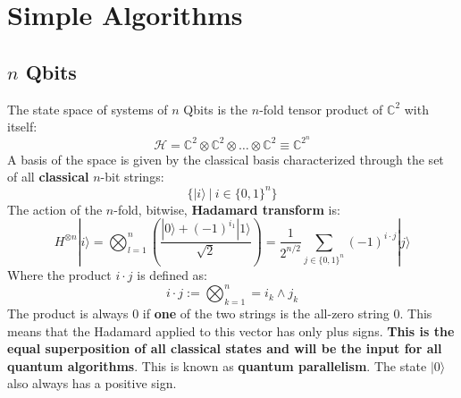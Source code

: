 \documentclass{article}
\begin{document}
\section{Simple Algorithms}
\subsection{$n$ Qbits}
The state space of systems of $n$ Qbits is the $n$-fold tensor product of $\mathbb{C}^2$ with itself:
\[ \mathcal{H} = \mathbb{C}^2 \otimes \mathbb{C}^2 \otimes \dots \otimes \mathbb{C}^2 \equiv \mathbb{C}^{2^n} \]
A basis of the space is given by the classical basis characterized through the set of all \textbf{classical} $n$-bit strings:
\[ \{ |i\rangle~|~i \in \{ 0, 1 \}^n \} \]
The action of the $n$-fold, bitwise, \textbf{Hadamard transform} is:
\[ H^{\otimes n} |i\rangle = \displaystyle\bigotimes^n_{l = 1} \left( \frac{|0\rangle + (-1)^{i_1} |1\rangle}{\sqrt{2}} \right) = \frac{1}{2^{n/2}} \displaystyle\sum_{j \in \{ 0,1 \}^n} (-1)^{i \cdot j}|j\rangle \]
Where the product $i \cdot j$ is defined as:
\[ i \cdot j := \displaystyle\bigotimes^n_{k=1} = i_k \wedge j_k \]
The product is always 0 if \textbf{one} of the two strings is the all-zero string 0. This means that the Hadamard applied to this vector has only plus signs. \textbf{This is the equal superposition of all classical states and will be the input for all quantum algorithms}. This is known as \textbf{quantum parallelism}. The state $|0\rangle$ also always has a positive sign.
\end{document}
